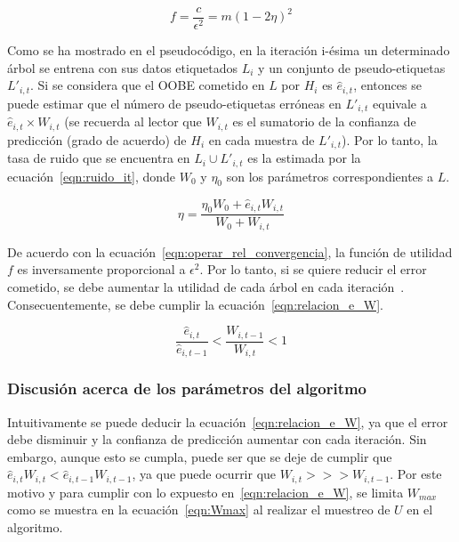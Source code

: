 \begin{equation}\label{eqn:operar_rel_convergencia} f = \frac{c}{\epsilon^{2}} = m(1-2\eta)^{2} \end{equation} 

Como se ha mostrado en el pseudocódigo, en la iteración i-ésima un determinado árbol se entrena con sus datos etiquetados $L_{i}$ y un conjunto de pseudo-etiquetas $L'_{i,t}$. Si se considera que el OOBE cometido en $L$ por $H_{i}$ es $\hat{e}_{i,t}$, entonces se puede estimar que el número de pseudo-etiquetas erróneas en $L'_{i,t}$ equivale a $\hat{e}_{i,t} \times W_{i,t}$ (se recuerda al lector que $W_{i,t}$ es el sumatorio de la confianza de predicción (grado de acuerdo) de $H_{i}$ en cada muestra de $L'_{i,t}$). Por lo tanto, la tasa de ruido que se encuentra en $L_{i} \cup L'_{i,t}$ es la estimada por la ecuación~\ref{eqn:ruido_it}, donde $W_0$ y $\eta_0$ son los parámetros correspondientes a $L$. 

\begin{equation}\label{eqn:ruido_it} \eta = \frac{\eta_{0}W_{0} + \hat{e}_{i,t}W_{i,t}}{W_{0} + W_{i,t}} \end{equation} 

De acuerdo con la ecuación~\ref{eqn:operar_rel_convergencia}, la función de utilidad $f$ es inversamente proporcional a $\epsilon^2$. Por lo tanto, si se quiere reducir el error cometido, se debe aumentar la utilidad de cada árbol en cada iteración~\cite{zhou2021SemisupervisedRecommendationAttack}. Consecuentemente, se debe cumplir la ecuación~\ref{eqn:relacion_e_W}. 

\begin{equation}\label{eqn:relacion_e_W} \frac{\hat{e}_{i,t}}{\widehat{e}_{i, t-1}} < \frac{W_{i,t-1}}{W_{i,t}} < 1 \end{equation} 


\subsubsection{Discusión acerca de los parámetros del algoritmo}

Intuitivamente se puede deducir la ecuación~\ref{eqn:relacion_e_W}, ya que el error debe disminuir y la confianza de predicción aumentar con cada iteración. Sin embargo, aunque esto se cumpla, puede ser que se deje de cumplir que $\hat{e}_{i,t}W_{i,t} < \hat{e}_{i,t-1}W_{i,t-1}$, ya que puede ocurrir que $ W_{i,t} >>> W_{i,t-1}$. Por este motivo y para cumplir con lo expuesto en~\ref{eqn:relacion_e_W}, se limita $W_{max}$ como se muestra en la ecuación~\ref{eqn:Wmax} al realizar el muestreo de $U$ en el algoritmo.

